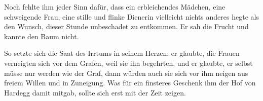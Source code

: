 Noch fehlte ihm jeder Sinn dafür, dass ein erbleichendes Mädchen, eine schweigende Frau, eine stille und flinke Dienerin vielleicht nichts anderes hegte als den Wunsch, dieser Stunde unbeschadet zu entkommen. Er sah die Frucht und kannte den Baum nicht.

So setzte sich die Saat des Irrtums in seinem Herzen: er glaubte, die Frauen verneigten sich vor dem Grafen, weil sie ihn begehrten, und er glaubte, er selbst müsse nur werden wie der Graf, dann würden auch sie sich vor ihm neigen aus freiem Willen und in Zuneigung. Was für ein finsteres Geschenk ihm der Hof von \gls{Hardegg} damit mitgab, sollte sich erst mit der Zeit zeigen.
